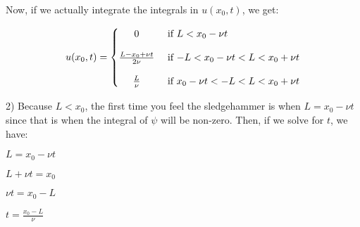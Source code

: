 \documentclass[executivepaper]{article}
\begin{document}
\begin{flushleft}
\begin{center}
\end{center}

Now, if we actually integrate the integrals in $u(x_{0},t)$, we get:

\begin{center}

\[
 u(x_{0},t)=
  \begin{cases}
      \hfill 0    \hfill & \text{ if $L < x_{0}-\nu t$} \\[1em]
      
      \hfill \frac{L-x_{0}+\nu t}{2\nu} \hfill & \text{ if $-L < x_{0}-\nu t < L < x_{0}+\nu t$} \\[1em]
      
      \hfill \frac{L}{\nu} \hfill & \text{ if $x_{0}-\nu t < -L < L < x_{0}+\nu t$}
  \end{cases}
\]

\end{center}

\end{flushleft}

\vspace{3mm}

\begin{flushleft}

2) Because $L < x_{0}$, the first time you feel the sledgehammer is when $L=x_{0}-\nu t$ since that is when the integral of $\psi$ will be non-zero. Then, if we solve for $t$, we have:

\begin{center}

$L=x_{0}-\nu t$

\vspace{1mm}

$L+\nu t=x_{0}$

\vspace{1mm}

$\nu t=x_{0}-L$

\vspace{1mm}

$t=\frac{x_{0}-L}{\nu}$

\end{center}

\end{flushleft}

\pagebreak

\vspace*{-40mm}
\end{document}
